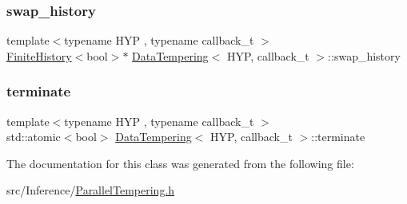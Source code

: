 \subsubsection{\texorpdfstring{swap\+\_\+history}{swap\_history}}
{\footnotesize\ttfamily template$<$typename H\+YP , typename callback\+\_\+t $>$ \\
\hyperlink{class_finite_history}{Finite\+History}$<$bool$>$$\ast$ \hyperlink{class_data_tempering}{Data\+Tempering}$<$ H\+YP, callback\+\_\+t $>$\+::swap\+\_\+history}

\mbox{\label{class_data_tempering_a03f9c6fd8faa8f88c63bbc84c388e82d}} 
\subsubsection{\texorpdfstring{terminate}{terminate}}
{\footnotesize\ttfamily template$<$typename H\+YP , typename callback\+\_\+t $>$ \\
std\+::atomic$<$bool$>$ \hyperlink{class_data_tempering}{Data\+Tempering}$<$ H\+YP, callback\+\_\+t $>$\+::terminate}



The documentation for this class was generated from the following file\+:\begin{DoxyCompactItemize}
\item 
src/\+Inference/\hyperlink{_parallel_tempering_8h}{Parallel\+Tempering.\+h}\end{DoxyCompactItemize}
